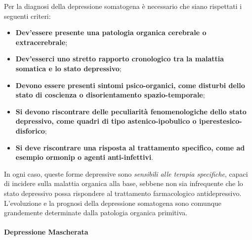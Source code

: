 Per la diagnosi della depressione somatogena è necessario che siano
rispettati i seguenti criteri:

\begin{itemize}
\item
  \textbf{Dev'essere presente una patologia organica cerebrale o
  extracerebrale};
\item
  \textbf{Dev'esserci uno stretto rapporto cronologico tra la malattia
  somatica e lo stato depressivo};
\item
  \textbf{Devono essere presenti sintomi psico-organici, come disturbi
  dello stato di coscienza o disorientamento spazio-temporale};
\item
  \textbf{Si devono riscontrare delle peculiarità fenomenologiche dello
  stato depressivo, come quadri di tipo astenico-ipobulico o
  iperestesico-disforico};
\item
  \textbf{Si deve riscontrare una risposta al trattamento specifico,
  come ad esempio ormonip o agenti anti-infettivi}.
\end{itemize}

In ogni caso, queste forme depressive sono \emph{sensibili alle terapia
specifiche}, capaci di incidere sulla malattia organica alla base,
sebbene non sia infrequente che lo stato depressivo possa rispondere al
trattamento farmacologico antidepressivo. L'evoluzione e la prognosi
della depressione somatogena sono comunque grandemente determinate dalla
patologia organica primitiva.

\paragraph{Depressione Mascherata}

